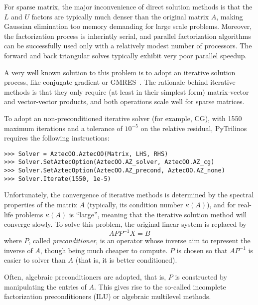 \documentclass[10pt,relax]{SANDreport}
\begin{document}
For sparse matrix, the major inconvenience of direct solution methods is that
the $L$ and $U$ factors are typically much denser than the original matrix
$A$, making Gaussian elimination too memory demanding for large scale
problems. Moreover, the factorization process is inherintly serial, and
parallel factorization algorithms can be successfully used only with a
relatively modest number of processors. The
forward and back triangular solves typically exhibit very poor parallel speedup.

A very well known solution to this problem is to adopt an iterative solution
process, like conjugate gradient or GMRES~\cite{FIXME}. The rationale behind
iterative methods is that they only require (at least in their simplest form)
matrix-vector and vector-vector products, and both operations scale well for
sparse matrices. 

To adopt an non-preconditioned iterative solver (for example, CG), with 1550
maximum iterations and a tolerance of $10^{-5}$ on the relative residual,
  PyTrilinos requires the following instructions:
\begin{verbatim}
>>> Solver = AztecOO.AztecOO(Matrix, LHS, RHS)
>>> Solver.SetAztecOption(AztecOO.AZ_solver, AztecOO.AZ_cg)
>>> Solver.SetAztecOption(AztecOO.AZ_precond, AztecOO.AZ_none)
>>> Solver.Iterate(1550, 1e-5)
\end{verbatim}

Unfortunately, the convergence of
iterative methods is determined by the spectral properties of the matrix $A$
(typically, its condition number $\kappa(A)$), and for
real-life problems $\kappa(A)$ is ``large'', meaning that the iterative
solution method will converge slowly. To solve this problem,
the original linear system is replaced by 
\[
A P P^{-1} X = B
\]
where $P$, called {\sl preconditioner}, is an operator whose inverse aim to
represent the inverse of $A$, though being much cheaper to compute.
$P$ is chosen so that $AP^{-1}$ is easier to solver than $A$ 
(that is, it is better conditioned). 

\smallskip

Often, algebraic preconditioners are adopted, that is, $P$ is constructed by
manipulating the entries of $A$. This gives rise to the so-called incomplete
factorization preconditioners (ILU) or algebraic multilevel methods. 
\end{document}
